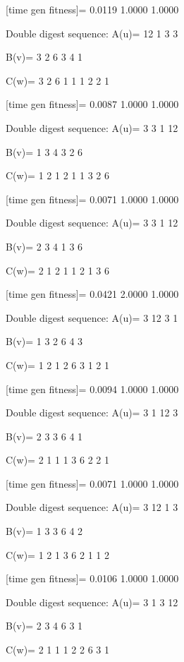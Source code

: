 [time gen fitness]=
    0.0119    1.0000    1.0000

Double digest sequence:
A(u)=
    12     1     3     3

B(v)=
     3     2     6     3     4     1

C(w)=
     3     2     6     1     1     1     2     2     1

[time gen fitness]=
    0.0087    1.0000    1.0000

Double digest sequence:
A(u)=
     3     3     1    12

B(v)=
     1     3     4     3     2     6

C(w)=
     1     2     1     2     1     1     3     2     6

[time gen fitness]=
    0.0071    1.0000    1.0000

Double digest sequence:
A(u)=
     3     3     1    12

B(v)=
     2     3     4     1     3     6

C(w)=
     2     1     2     1     1     2     1     3     6

[time gen fitness]=
    0.0421    2.0000    1.0000

Double digest sequence:
A(u)=
     3    12     3     1

B(v)=
     1     3     2     6     4     3

C(w)=
     1     2     1     2     6     3     1     2     1

[time gen fitness]=
    0.0094    1.0000    1.0000

Double digest sequence:
A(u)=
     3     1    12     3

B(v)=
     2     3     3     6     4     1

C(w)=
     2     1     1     1     3     6     2     2     1

[time gen fitness]=
    0.0071    1.0000    1.0000

Double digest sequence:
A(u)=
     3    12     1     3

B(v)=
     1     3     3     6     4     2

C(w)=
     1     2     1     3     6     2     1     1     2

[time gen fitness]=
    0.0106    1.0000    1.0000

Double digest sequence:
A(u)=
     3     1     3    12

B(v)=
     2     3     4     6     3     1

C(w)=
     2     1     1     1     2     2     6     3     1

